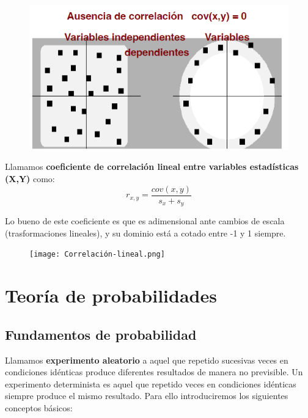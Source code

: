 \documentclass[12pt,a4paper]{book}
\begin{document}
 \begin{figure}[h!] \centering
\includegraphics[scale=0.8]{covarianza1.png}
\end{figure}

Llamamos \textbf{coeficiente de correlación lineal entre variables estadísticas (X,Y)} como:
\begin{equation}
r_{x,y} = \dfrac{cov(x,y)}{s_x + s_y}
\end{equation}

Lo bueno de este coeficiente es que es adimensional ante cambios de escala (trasformaciones lineales), y su dominio está a cotado entre -1 y 1 siempre.  \newpage

\begin{figure}[h] \centering
\texttt{[image: Correlación-lineal.png]}
\end{figure}



\newpage

\chapter{Teoría de probabilidades}

\section{Fundamentos de probabilidad}
Llamamos \textbf{experimento aleatorio} a aquel que repetido sucesivas veces en condiciones idénticas produce diferentes resultados de manera no previsible. Un experimento determinista es aquel que repetido  veces en condiciones idénticas siempre produce el mismo resultado. Para ello introduciremos los siguientes conceptos básicos: 
\end{document}
